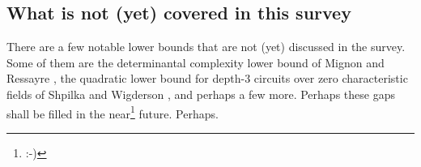 \subsection*{What is not (yet) covered in this survey}

There are a few notable lower bounds that are not (yet) discussed in the survey. 
Some of them are the determinantal complexity lower bound of Mignon and Ressayre \cite{mr04}, the quadratic lower bound for depth-$3$ circuits over zero characteristic fields of Shpilka and Wigderson \cite{sw2001}, and perhaps a few more. 
Perhaps these gaps shall be filled in the near\footnote{:-)} future. 
Perhaps. 



